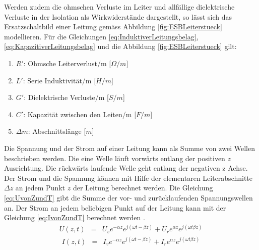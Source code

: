 Werden zudem die ohmschen Verluste im Leiter und allfällige dielektrische Verluste in der Isolation als Wirkwiderstände dargestellt, so lässt sich das Ersatzschaltbild einer Leitung gemäss Abbildung \ref{fig:ESBLeiterstueck} modellieren.
Für die Gleichungen \ref{eq:InduktiverLeitungsbelag}, \ref{eq:KapazitiverLeitungsbelag} und die Abbildung \ref{fig:ESBLeiterstueck} gilt:
\begin{enumerate}[leftmargin=2cm]
   \item[] $R'$: Ohmsche Leiterverlust/m [$\Omega/m$] 
   \item[] $L'$: Serie Induktivität/m  [$H/m$] 
   \item[] $G'$: Dielektrische Verluste/m  [$S/m$] 
   \item[] $C'$: Kapazität zwischen den Leiten/m  [$F/m$] 
   \item[] $\Delta m$: Abschnittslänge  [$m$] 
\end{enumerate} 
Die Spannung und der Strom auf einer Leitung kann als Summe von zwei Wellen beschrieben werden. Die eine Welle läuft vorwärts entlang der positiven $z$ Ausrichtung. Die rückwärts laufende Welle geht entlang der negativen z Achse. Der Strom und die Spannung können mit Hilfe der elementaren Leiterabschnitte $\Delta z$ an jedem Punkt $z$  der Leitung berechnet werden. Die Gleichung \ref{eq:UvonZundT} gibt die Summe der vor- und zurücklaufenden Spannungswellen an. Der Strom an jedem beliebigen Punkt auf der Leitung kann mit der Gleichung \ref{eq:IvonZundT} berechnet werden \cite{Tekom}.
\begin{eqnarray}\label{eq:UvonZundT}
U(z,t) &=& U_{v}e^{-\alpha z}e^{j(\omega t -\beta z)}+U_{r}e^{\alpha z}e^{j(\omega t \beta z)}
\end{eqnarray}
\begin{eqnarray}\label{eq:IvonZundT}
I(z,t) &=& I_{v}e^{-\alpha z}e^{j(\omega t -\beta z)}+I_{r}e^{\alpha z}e^{j(\omega t \beta z)}
\end{eqnarray}

